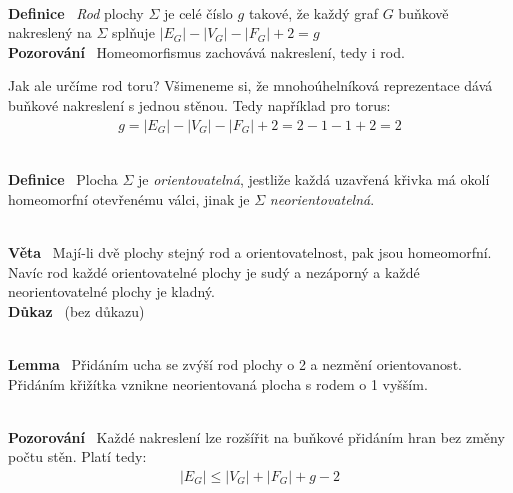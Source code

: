 \documentclass{article}
\renewcommand{\paragraph}[1]{\ \\\smallskip\noindent\textbf{#1}\ }
\begin{document}
\paragraph{Definice} \textit{Rod} plochy $\Sigma$ je celé číslo $g$ takové, že 
každý graf $G$ buňkově nakreslený na $\Sigma$ splňuje $|E_G| - |V_G| - |F_G| + 2 
= g$
\paragraph{Pozorování} Homeomorfismus zachovává nakreslení, tedy i rod.

Jak ale určíme rod toru? Všimeneme si, že mnohoúhelníková reprezentace dává 
buňkové nakreslení s jednou stěnou. Tedy například pro torus:
\begin{align}
	g = |E_G| - |V_G| - |F_G| + 2 = 2 -1 -1 +2 = 2
\end{align}

\paragraph{Definice} Plocha $\Sigma$ je \textit{orientovatelná}, jestliže každá 
uzavřená křivka má okolí homeomorfní otevřenému válci, jinak je $\Sigma$ 
\textit{neorientovatelná}.

\paragraph{Věta}
Mají-li dvě plochy stejný rod a orientovatelnost, pak jsou homeomorfní. Navíc 
rod každé orientovatelné plochy je sudý a nezáporný a každé neorientovatelné 
plochy je kladný.
\paragraph{Důkaz} (bez důkazu)

\paragraph{Lemma}
Přidáním ucha se zvýší rod plochy o 2 a nezmění orientovanost. Přidáním křižítka 
vznikne neorientovaná plocha s rodem o 1 vyšším.

\paragraph{Pozorování}
Každé nakreslení lze rozšířit na buňkové přidáním hran bez změny počtu stěn.  
Platí tedy:
\begin{align}
	|E_G| \leq |V_G| + |F_G| + g - 2
\end{align}
\end{document}
